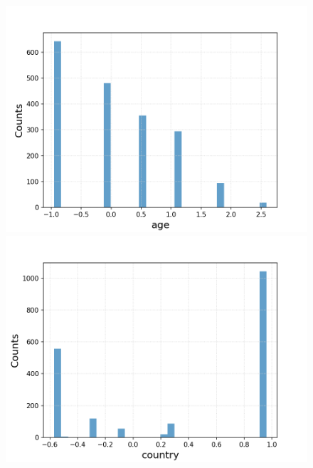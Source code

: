 \documentclass{article}
\begin{document}
\begin{figure}[h!]
	\centering
	\begin{minipage}[b]{0.32\textwidth}
		\includegraphics[width=\textwidth]{plots/drugsPlots/age.png}

	\end{minipage}
	\begin{minipage}[b]{0.32\textwidth}
		\includegraphics[width=\textwidth]{plots/drugsPlots/country.png}


\end{minipage}
\end{figure}
\end{document}
